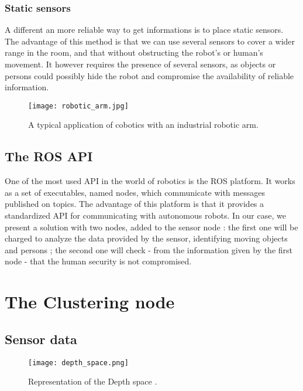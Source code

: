 \documentclass[smallextended]{svjour3}
\begin{document}
\subsubsection{Static sensors}

A different an more reliable way to get informations is to place static sensors. The advantage of this method is that we can use several sensors to cover a wider range in the room, and that without obstructing the robot's or human's movement. It however requires the presence of several sensors, as objects or persons could possibly hide the robot and compromise the availability of reliable information.


\begin{figure}
\centering
\texttt{[image: robotic\_arm.jpg]}
\caption{\label{fig:robotic_arm}A typical application of cobotics with an industrial robotic arm.}
\end{figure}

\subsection{The ROS API}

One of the most used API in the world of robotics is the ROS platform. It works as a set of executables, named nodes, which communicate with messages published on topics. The advantage of this platform is that it provides a standardized API for communicating with autonomous robots. In our case, we present a solution with two nodes, added to the sensor node : the first one will be charged to analyze the data provided by the sensor, identifying moving objects and persons ; the second one will check - from the information given by the first node - that the human security is not compromised.

\section{The Clustering node}

\subsection{Sensor data}

\begin{figure}
\centering
\texttt{[image: depth\_space.png]}
\caption{\label{fig:depth_space}Representation of the Depth space \cite{Ref1}.}
\end{figure}
\end{document}
